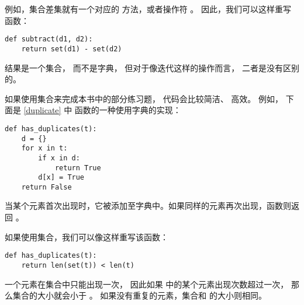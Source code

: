 例如，集合差集就有一个对应的  方法，或者操作符 \li{-}。  
因此，我们可以这样重写  函数：

\begin{lstlisting}
def subtract(d1, d2):
    return set(d1) - set(d2)
\end{lstlisting}


结果是一个集合， 而不是字典， 但对于像迭代这样的操作而言， 二者是没有区别的。


如果使用集合来完成本书中的部分练习题， 代码会比较简洁、 高效。  
例如， 下面是 \ref{duplicate} 中  函数的一种使用字典的实现：

\begin{lstlisting}
def has_duplicates(t):
    d = {}
    for x in t:
        if x in d:
            return True
        d[x] = True
    return False
\end{lstlisting}


当某个元素首次出现时，它被添加至字典中。如果同样的元素再次出现，函数则返回  。


如果使用集合，我们可以像这样重写该函数：

\begin{lstlisting}
def has_duplicates(t):
    return len(set(t)) < len(t)
\end{lstlisting}


一个元素在集合中只能出现一次， 因此如果  中的某个元素出现次数超过一次， 那么集合的大小就会小于 。  如果没有重复的元素，集合和  的大小则相同。


